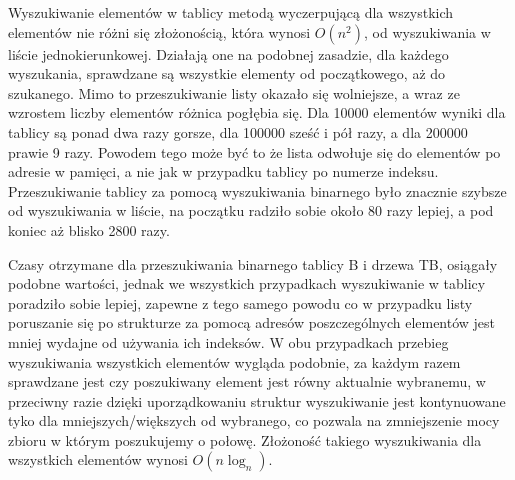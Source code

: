 \documentclass[polish,polish,a4paper]{article}
\begin{document}
Wyszukiwanie elementów w tablicy metodą wyczerpującą dla wszystkich elementów nie różni się złożonością, która wynosi $O(n^2)$,  od wyszukiwania w liście jednokierunkowej. Działają one na podobnej zasadzie, dla każdego wyszukania, sprawdzane są wszystkie elementy od początkowego, aż do szukanego. Mimo to przeszukiwanie listy okazało się wolniejsze, a wraz ze wzrostem liczby elementów różnica pogłębia się. Dla 10000 elementów wyniki dla tablicy są ponad dwa razy gorsze, dla 100000 sześć i pół razy, a dla 200000 prawie 9 razy. Powodem tego może być to że lista odwołuje się do elementów po adresie w pamięci, a nie jak w przypadku tablicy po numerze indeksu.
Przeszukiwanie  tablicy za pomocą wyszukiwania binarnego było znacznie szybsze od wyszukiwania w liście, na początku radziło sobie około 80 razy lepiej, a pod koniec aż blisko 2800 razy.

Czasy otrzymane dla przeszukiwania binarnego tablicy B i drzewa TB, osiągały podobne wartości, jednak we wszystkich przypadkach wyszukiwanie w tablicy poradziło sobie lepiej, zapewne z tego samego powodu co w przypadku listy poruszanie się po strukturze za pomocą adresów poszczególnych elementów jest mniej wydajne od używania ich indeksów. W obu przypadkach przebieg wyszukiwania wszystkich elementów wygląda podobnie, za każdym razem sprawdzane jest czy poszukiwany element jest równy aktualnie wybranemu, w przeciwny razie dzięki uporządkowaniu struktur wyszukiwanie jest kontynuowane tyko dla mniejszych/większych od wybranego, co pozwala na zmniejszenie mocy zbioru w którym poszukujemy o połowę. Złożoność takiego wyszukiwania dla wszystkich elementów wynosi $O(n\log_{n})$.
\end{document}
